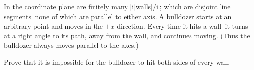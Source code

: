 In the coordinate plane are finitely many [i]walls[/i]; which are disjoint line segments, none of which are parallel to either axis. A bulldozer starts at an arbitrary point and moves in the $+x$ direction. Every time  it hits a wall, it turns at a right angle to its path, away from the wall, and continues moving. (Thus the bulldozer always moves parallel to the axes.)

Prove that it is impossible for the bulldozer to hit both sides of every wall.